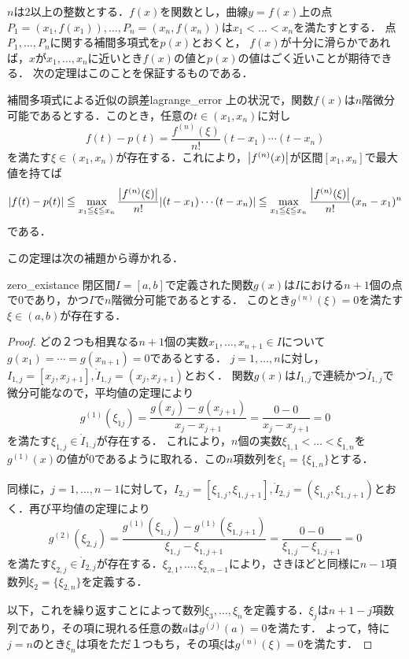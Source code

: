 \documentclass[a4paper]{ltjsarticle}
\theoremstyle{definition}
\DeclarePairedDelimiter{\abs}{\lvert}{\rvert}
\begin{document}
$n$は$2$以上の整数とする．$f(x)$を関数とし，曲線$y=f(x)$上の点$P_1=(x_1, f(x_1)),\dots,P_n=(x_n, f(x_n))$は$x_1<\dots<x_n$を満たすとする．
点$P_1,\dots,P_n$に関する補間多項式を$p(x)$とおくと，
$f(x)$が十分に滑らかであれば，$x$が$x_1,\dots,x_n$に近いとき$f(x)$の値と$p(x)$の値はごく近いことが期待できる．
次の定理はこのことを保証するものである．

\begin{theorem}{補間多項式による近似の誤差}{lagrange_error}
  上の状況で，関数$f(x)$は$n$階微分可能であるとする．このとき，任意の$t\in (x_1,x_n)$に対し
  \[
    f(t)-p(t) = \frac{f^{(n)} (\xi)}{n!} (t-x_1)\cdots (t-x_n)
  \]
  を満たす$\xi \in (x_1, x_n)$が存在する．これにより，$\abs*{f^{(n)}(x)}$が区間$[x_1, x_n]$で最大値を持てば
  \[
    \abs*{f(t)-p(t)}
    \leqq \max_{x_1\leqq\xi\leqq x_n} \frac{\abs*{f^{(n)}(\xi)}}{n!} \abs*{(t-x_1)\cdots (t-x_n)}
    \leqq \max_{x_1\leqq\xi\leqq x_n} \frac{\abs*{f^{(n)}(\xi)}}{n!} (x_n-x_1)^n
  \]
  である．
\end{theorem}

この定理は次の補題から導かれる．

\begin{lemma}{}{zero_existance}
  閉区間$I=[a,b]$で定義された関数$g(x)$は$I$における$n+1$個の点で$0$であり，かつ$I$で$n$階微分可能であるとする．
  このとき$g^{(n)}(\xi) = 0$を満たす$\xi \in (a,b)$が存在する．
\end{lemma}

\begin{proof}
  どの２つも相異なる$n+1$個の実数$x_1,\dots,x_{n+1} \in I$について$g(x_1) = \cdots = g(x_{n+1}) =0$であるとする．
  $j=1,\dots,n$に対し，$I_{1,j}=[x_j,x_{j+1}], \mathring{I}_{1,j}=(x_j,x_{j+1})$とおく．
  関数$g(x)$は$I_{1,j}$で連続かつ$\mathring{I}_{1,j}$で微分可能なので，平均値の定理により
  \[
    g^{(1)}(\xi_{1j}) = \frac{g(x_j)-g(x_{j+1})}{x_j-x_{j+1}} = \frac{0-0}{x_j-x_{j+1}}=0
  \]
  を満たす$\xi_{1,j} \in \mathring{I}_{1,j}$が存在する．
  これにより，$n$個の実数$\xi_{1,1} < \dots < \xi_{1,n}$を$g^{(1)}(x)$の値が$0$であるように取れる．この$n$項数列を$\xi_1 = \{ \xi_{1,n} \}$とする．

  同様に，$j=1,\dots,n-1$に対して，$I_{2,j}=[\xi_{1,j},\xi_{1,j+1}], \mathring{I}_{2,j}=(\xi_{1,j},\xi_{1,j+1})$とおく．再び平均値の定理により
  \[
    g^{(2)}(\xi_{2,j}) = \frac{g^{(1)}(\xi_{1,j})-g^{(1)}(\xi_{1,j+1})}{\xi_{1,j}-\xi_{1,j+1}} = \frac{0-0}{\xi_{1,j}-\xi_{1,j+1}} = 0
  \]
  を満たす$\xi_{2,j} \in \mathring{I}_{2,j}$が存在する．$\xi_{2,1},\dots,\xi_{2,n-1}$により，さきほどと同様に$n-1$項数列$\xi_2 = \{ \xi_{2,n} \}$を定義する．

  以下，これを繰り返すことによって数列$\xi_3,\dots,\xi_n$を定義する．$\xi_j$は$n+1-j$項数列であり，その項に現れる任意の数$a$は$g^{(j)}(a)=0$を満たす．
  よって，特に$j=n$のとき$\xi_n$は項をただ１つもち，その項$\xi$は$g^{(n)}(\xi)=0$を満たす．
\end{proof}
\end{document}
